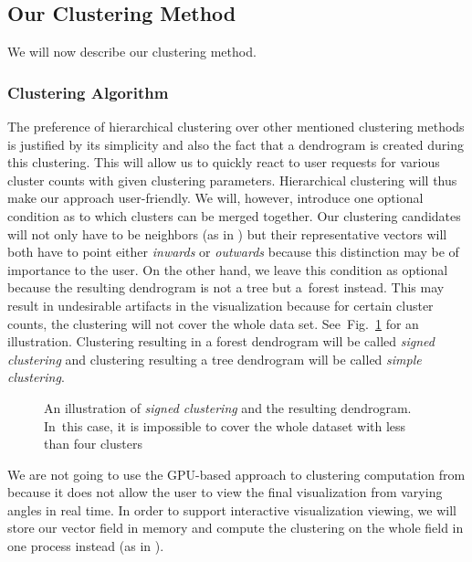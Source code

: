 \subsection{Our Clustering Method}
\label{subsec:analysis-field_clustering-our_method}

We will now describe our clustering method.

\subsubsection{Clustering Algorithm}

The preference of hierarchical clustering over other mentioned clustering methods is justified by its simplicity and also the fact that a dendrogram is created during this clustering. This will allow us to quickly react to user requests for various cluster counts with given clustering parameters. Hierarchical clustering will thus make our approach user-friendly. We will, however, introduce one optional condition as to which clusters can be merged together. Our clustering candidates will not only have to be neighbors (as in \citet{Telea99}) but their representative vectors will both have to point either {\it inwards} or {\it outwards} because this distinction may be of importance to the user. On the other hand, we leave this condition as optional because the resulting dendrogram is not a tree but a~forest instead. This may result in undesirable artifacts in the visualization because for certain cluster counts, the clustering will not cover the whole data set. See~Fig.~\ref{fig:illustration-forest_dendrogram} for an illustration. Clustering resulting in a forest dendrogram will be called {\it signed clustering} and clustering resulting a tree dendrogram will be called {\it simple clustering}.

\begin{figure}[h]
\centering
\def\svgwidth{\textwidth}

\caption[Forest dendrogram]{An illustration of {\it signed clustering} and the resulting dendrogram. In~this case, it is impossible to cover the whole dataset with less than four clusters}
\label{fig:illustration-forest_dendrogram}
\end{figure}

We are not going to use the GPU-based approach to clustering computation from \citet{Peng12} because it does not allow the user to view the final visualization from varying angles in real time. In order to support interactive visualization viewing, we will store our vector field in memory and compute the clustering on the whole field in one process instead (as in \citet{Telea99}).

